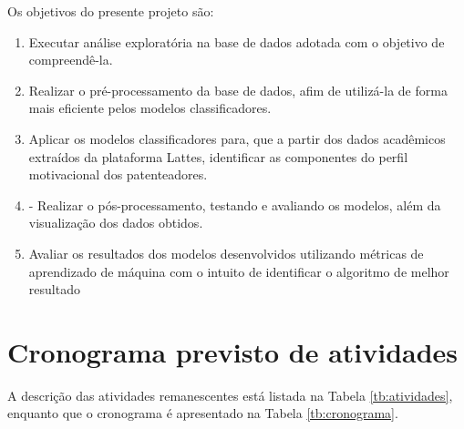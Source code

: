 \documentclass[tcc1,project]{uftex}
\begin{document}
Os objetivos do presente projeto são: 
\begin{enumerate}
	\item Executar análise exploratória na base de dados adotada com o objetivo de compreendê-la.
	\item Realizar o pré-processamento da base de dados, afim de utilizá-la de forma mais eficiente pelos modelos classificadores.
	\item Aplicar os modelos classificadores para, que a partir dos dados acadêmicos extraídos da plataforma Lattes, identificar as componentes do perfil motivacional dos patenteadores.
        \item - Realizar o pós-processamento, testando e avaliando os modelos, além da visualização dos dados obtidos.
        \item Avaliar os resultados dos modelos desenvolvidos utilizando métricas de aprendizado de máquina com o intuito de identificar o algoritmo de melhor resultado
\end{enumerate}

\section*{Cronograma previsto de atividades \label{sec:crono}}

A descrição das atividades remanescentes está listada na Tabela \ref{tb:atividades}, enquanto que o cronograma é apresentado na Tabela \ref{tb:cronograma}.

\end{document}
